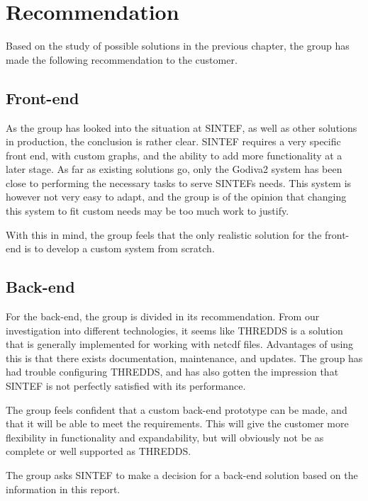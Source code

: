 \documentclass[11pt,a4paper,titlepage,oneside]{report}
\begin{document}
\section{Recommendation}
Based on the study of possible solutions in the previous chapter, the group has made the following recommendation to the customer.

\subsection{Front-end}
As the group has looked into the situation at SINTEF, as well as other solutions in production, the conclusion is rather clear. SINTEF requires a very specific front end, with custom graphs, and the ability to add more functionality at a later stage. As far as existing solutions go, only the Godiva2 system has been close to performing the necessary tasks to serve SINTEFs needs. This system is however not very easy to adapt, and the group is of the opinion that changing this system to fit custom needs may be too much work to justify.

With this in mind, the group feels that the only realistic solution for the front-end is to develop a custom system from scratch.

\subsection{Back-end}
For the back-end, the group is divided in its recommendation. From our investigation into different technologies, it seems like \gls{THREDDS} is a solution that is generally implemented for working with \gls{netcdf} files. Advantages of using this is that there exists documentation, maintenance, and updates. The group has had trouble configuring \gls{THREDDS}, and has also gotten the impression that SINTEF is not perfectly satisfied with its performance. 

The group feels confident that a custom back-end prototype can be made, and that it will be able to meet the requirements. This will give the customer more flexibility in functionality and expandability, but will obviously not be as complete or well supported as \gls{THREDDS}.

The group asks SINTEF to make a decision for a back-end solution based on the information in this report.
\end{document}
